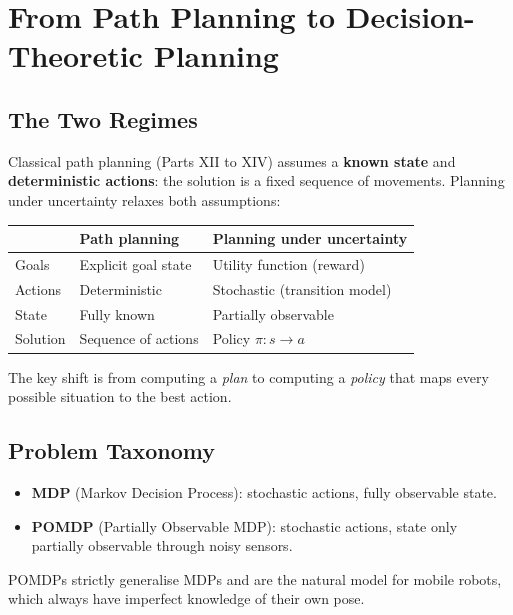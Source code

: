 \documentclass[11pt,a4paper]{article}
\theoremstyle{definition}
\theoremstyle{plain}
\theoremstyle{remark}
\begin{document}
\section{From Path Planning to Decision-Theoretic Planning}

\subsection{The Two Regimes}

Classical path planning (Parts XII to XIV) assumes a \textbf{known state} and \textbf{deterministic actions}: the solution is a fixed sequence of movements. Planning under uncertainty relaxes both assumptions:

\begin{center}
\begin{tabular}{lll}
\hline
 & \textbf{Path planning} & \textbf{Planning under uncertainty} \\
\hline
Goals        & Explicit goal state          & Utility function (reward) \\
Actions      & Deterministic                & Stochastic (transition model) \\
State        & Fully known                  & Partially observable \\
Solution     & Sequence of actions          & Policy $\pi : s \to a$ \\
\hline
\end{tabular}
\end{center}

The key shift is from computing a \emph{plan} to computing a \emph{policy} that maps every possible situation to the best action.

\subsection{Problem Taxonomy}

\begin{itemize}
    \item \textbf{MDP} (Markov Decision Process): stochastic actions, fully observable state.
    \item \textbf{POMDP} (Partially Observable MDP): stochastic actions, state only partially observable through noisy sensors.
\end{itemize}

POMDPs strictly generalise MDPs and are the natural model for mobile robots, which always have imperfect knowledge of their own pose.
\end{document}
